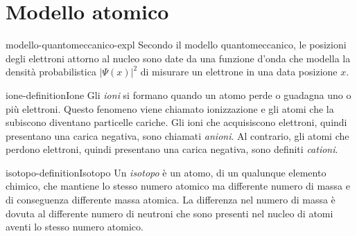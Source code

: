 \documentclass[preview]{standalone}
\begin{document}
\genpage

\section{Modello atomico}


\begin{snippet}{modello-quantomeccanico-expl}
    Secondo il modello quantomeccanico, le posizioni degli elettroni
    attorno al nucleo sono date da una funzione d'onda che modella la densità
    probabilistica \({|\Psi(x)|}^2\) di misurare un elettrone in una data posizione \(x\).
\end{snippet}

\begin{snippetdefinition}{ione-definition}{Ione}
    Gli \textit{ioni} si formano quando un atomo perde o guadagna uno o più elettroni.
    Questo fenomeno viene chiamato ionizzazione e gli atomi che la subiscono diventano
    particelle cariche.
    Gli ioni che acquisiscono elettroni, quindi presentano una carica negativa, sono chiamati
    \textit{anioni}.
    Al contrario, gli atomi che perdono elettroni, quindi presentano
    una carica negativa, sono definiti \textit{cationi}.
\end{snippetdefinition}

\begin{snippetdefinition}{isotopo-definition}{Isotopo}
    Un \textit{isotopo} è un atomo, di un qualunque elemento chimico, che mantiene
    lo stesso numero atomico ma differente numero di massa e di conseguenza differente massa atomica.
    La differenza nel numero di massa è dovuta al differente numero di neutroni che sono presenti nel
    nucleo di atomi aventi lo stesso numero atomico.
\end{snippetdefinition}
\end{document}
